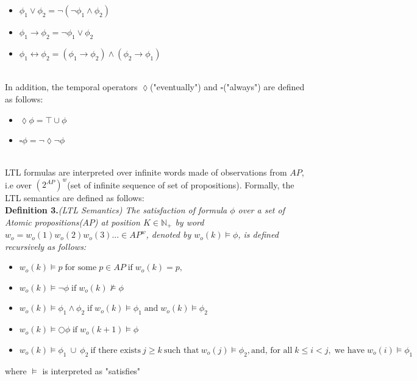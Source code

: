 \documentclass[letterpaper, 10 pt, conference]{ieeeconf}  %
\begin{document}
\begin{itemize}
    \item $\phi_1 \vee \phi_2 = \neg(\neg \phi_1 \wedge \phi_2)$
    \item $\phi_1 \rightarrow \phi_2 = \neg \phi_1 \vee \phi_2 $
    \item $\phi_1 \leftrightarrow \phi_2 = (\phi_1 \rightarrow \phi_2) \wedge (\phi_2 \rightarrow \phi_1)$
\end{itemize}\\

In addition, the temporal operators $\lozenge$("eventually") and $\square$("always") are defined as follows:

\begin{itemize}
    \item $\lozenge \phi = \top \cup \phi$
    \item $\square \phi = \neg \lozenge \neg \phi$
\end{itemize}\\

LTL formulas are interpreted over infinite words made of observations from $AP$, i.e over $(2^{AP})^w$(set of infinite sequence of set of propositions). Formally, the LTL semantics are defined as follows:\\

\textbf{Definition 3.}\textit{(LTL Semantics) The satisfaction of formula $\phi$ over a set of Atomic propositions($AP$) at position $K \in \mathbb{N_+}$ by word $w_o =w_o(1)w_o(2)w_o(3)... \in AP^w $, denoted by $w_o(k) \models \phi$, is defined recursively as follows:}
\begin{itemize}
     \item
    $w_o(k) \models p \; \text{for some}\; p \in AP   \; \text{if}\; w_o(k) = p,$ 
    \item 
    $w_o(k) \models \neg \phi\; \text{if} \; w_o(k) \not\models \phi$
    \item
    $w_o(k) \models \phi_1 \wedge \phi_2\; \text{if}\; w_o(k) \models \phi_1\; \text{and}\; w_o(k) \models \phi_2$
    \item
    $w_o(k) \models \bigcirc \phi\; \text{if}\; w_o(k+1) \models \phi$\
    \item
    $w_o(k) \models \phi_1\: \cup\: \phi_2\: \text{if there exists}\: j \geq k\: \text{such that}\: w_o(j) \models \phi_2,\text{and, for all}\; k \leq i < j,\; \text{we have}\; w_o(i) \models \phi_1 $
\end{itemize}

where $\models$ is interpreted as "satisfies"\\
\end{document}
